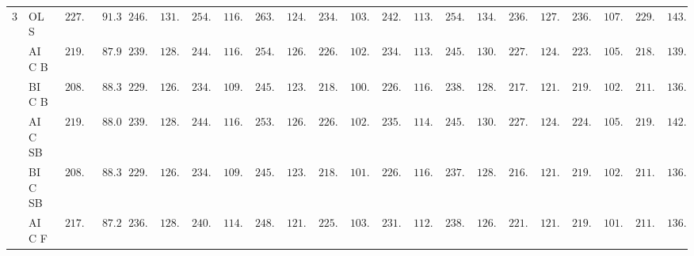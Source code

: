 \begin{tabular}{p{0.2cm}p{1cm}|p{0.6cm}p{0.6cm}|p{0.6cm}p{0.6cm}p{0.6cm}p{0.6cm}p{0.6cm}p{0.6cm}|p{0.6cm}p{0.6cm}p{0.6cm}p{0.6cm}p{0.6cm}p{0.6cm}|p{0.6cm}p{0.6cm}p{0.6cm}p{0.6cm}p{0.6cm}p{0.6cm}}
3 & OLS  & $\phantom{0}227.12$ & $\phantom{00}91.36$ & $\phantom{0}246.45$ & $\phantom{0}131.00$ & $\phantom{0}254.50$ & $\phantom{0}116.11$ & $\phantom{0}263.25$ & $\phantom{0}124.25$ & $\phantom{0}234.93$ & $\phantom{0}103.87$ & $\phantom{0}242.48$ & $\phantom{0}113.08$ & $\phantom{0}254.80$ & $\phantom{0}134.20$ & $\phantom{0}236.95$ & $\phantom{0}127.17$ & $\phantom{0}236.54$ & $\phantom{0}107.72$ & $\phantom{0}229.57$ & $\phantom{0}143.83$ \\
 & AIC B  & $\phantom{0}219.56$ & $\phantom{00}87.95$ & $\phantom{0}239.87$ & $\phantom{0}128.20$ & $\phantom{0}244.90$ & $\phantom{0}116.80$ & $\phantom{0}254.06$ & $\phantom{0}126.54$ & $\phantom{0}226.48$ & $\phantom{0}102.96$ & $\phantom{0}234.66$ & $\phantom{0}113.91$ & $\phantom{0}245.63$ & $\phantom{0}130.81$ & $\phantom{0}227.11$ & $\phantom{0}124.11$ & $\phantom{0}223.90$ & $\phantom{0}105.20$ & $\phantom{0}218.46$ & $\phantom{0}139.84$ \\
 & BIC B  & $\phantom{0}208.66$ & $\phantom{00}88.38$ & $\phantom{0}229.43$ & $\phantom{0}126.32$ & $\phantom{0}234.77$ & $\phantom{0}109.74$ & $\phantom{0}245.44$ & $\phantom{0}123.81$ & $\phantom{0}218.33$ & $\phantom{0}100.93$ & $\phantom{0}226.51$ & $\phantom{0}116.28$ & $\phantom{0}238.15$ & $\phantom{0}128.52$ & $\phantom{0}217.58$ & $\phantom{0}121.53$ & $\phantom{0}219.57$ & $\phantom{0}102.17$ & $\phantom{0}211.62$ & $\phantom{0}136.33$ \\
 & AIC SB  & $\phantom{0}219.46$ & $\phantom{00}88.01$ & $\phantom{0}239.87$ & $\phantom{0}128.20$ & $\phantom{0}244.90$ & $\phantom{0}116.80$ & $\phantom{0}253.99$ & $\phantom{0}126.60$ & $\phantom{0}226.49$ & $\phantom{0}102.95$ & $\phantom{0}235.08$ & $\phantom{0}114.10$ & $\phantom{0}245.57$ & $\phantom{0}130.79$ & $\phantom{0}227.12$ & $\phantom{0}124.12$ & $\phantom{0}224.20$ & $\phantom{0}105.46$ & $\phantom{0}219.58$ & $\phantom{0}142.51$ \\
 & BIC SB  & $\phantom{0}208.66$ & $\phantom{00}88.38$ & $\phantom{0}229.43$ & $\phantom{0}126.32$ & $\phantom{0}234.72$ & $\phantom{0}109.79$ & $\phantom{0}245.50$ & $\phantom{0}123.82$ & $\phantom{0}218.54$ & $\phantom{0}101.02$ & $\phantom{0}226.33$ & $\phantom{0}116.24$ & $\phantom{0}237.34$ & $\phantom{0}128.49$ & $\phantom{0}216.89$ & $\phantom{0}121.86$ & $\phantom{0}219.57$ & $\phantom{0}102.17$ & $\phantom{0}211.62$ & $\phantom{0}136.33$ \\
 & AIC F  & $\phantom{0}217.01$ & $\phantom{00}87.28$ & $\phantom{0}236.19$ & $\phantom{0}128.24$ & $\phantom{0}240.08$ & $\phantom{0}114.50$ & $\phantom{0}248.34$ & $\phantom{0}121.91$ & $\phantom{0}225.09$ & $\phantom{0}103.13$ & $\phantom{0}231.43$ & $\phantom{0}112.68$ & $\phantom{0}238.13$ & $\phantom{0}126.71$ & $\phantom{0}221.23$ & $\phantom{0}121.50$ & $\phantom{0}219.38$ & $\phantom{0}101.49$ & $\phantom{0}211.56$ & $\phantom{0}136.84$ \\

\end{tabular}
